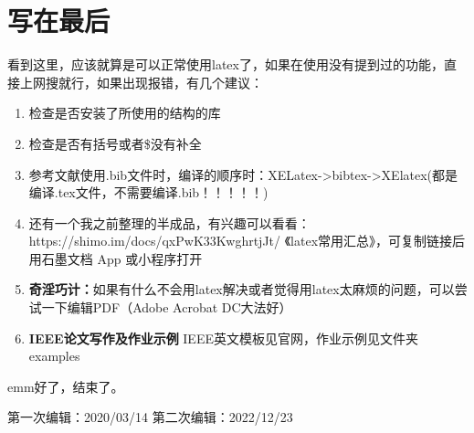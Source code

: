 \documentclass[UTF8]{ctexart}
\begin{document}
\section{写在最后}
看到这里，应该就算是可以正常使用latex了，如果在使用没有提到过的功能，直接上网搜就行，如果出现报错，有几个建议：
\begin{enumerate}
\item 检查是否安装了所使用的结构的库
\item 检查是否有括号或者\$没有补全
\item 参考文献使用.bib文件时，编译的顺序时：XELatex->bibtex->XElatex(都是编译.tex文件，不需要编译.bib！！！！！)
\item 还有一个我之前整理的半成品，有兴趣可以看看：https://shimo.im/docs/qxPwK33KwghrtjJt/ 
《latex常用汇总》，可复制链接后用石墨文档 App 或小程序打开
\item \textbf{奇淫巧计：}如果有什么不会用latex解决或者觉得用latex太麻烦的问题，可以尝试一下编辑PDF（Adobe Acrobat DC大法好）
\item \textbf{IEEE论文写作及作业示例} IEEE英文模板见官网，作业示例见文件夹examples
\end{enumerate}
emm好了，结束了。

第一次编辑：2020/03/14
第二次编辑：2022/12/23
\end{document}
